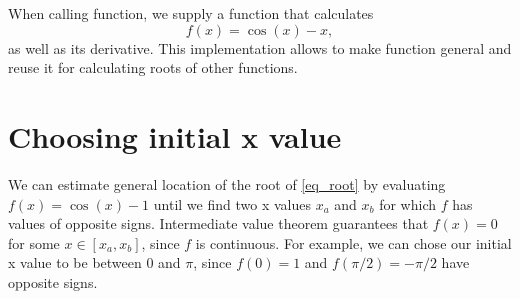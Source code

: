 When calling  function, we supply a function that calculates
\[
  f(x) = \cos(x) - x,
\]
as well as its derivative. This implementation allows to make  function general and reuse it for calculating roots of other functions.


\section{Choosing initial x value}

We can estimate general location of the root of \autoref{eq_root} by evaluating $f(x) = \cos(x) - 1$ until we find two x values $x_a$ and $x_b$ for which $f$ has values of opposite signs. Intermediate value theorem guarantees that $f(x)=0$ for some $x \in [x_a, x_b]$, since $f$ is continuous. For example, we can chose our initial x value to be between $0$ and $\pi$, since $f(0)=1$ and $f(\pi/2) = -\pi/2$ have opposite signs.

